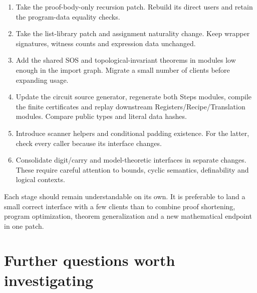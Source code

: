 \documentclass[11pt,letterpaper]{article}
\begin{document}
\begin{enumerate}
\item Take the proof-body-only recursion patch. Rebuild its direct users and retain the program-data equality checks.
\item Take the list-library patch and assignment naturality change. Keep wrapper signatures, witness counts and expression data unchanged.
\item Add the shared SOS and topological-invariant theorems in modules low enough in the import graph. Migrate a small number of clients before expanding usage.
\item Update the circuit source generator, regenerate both Steps modules, compile the finite certificates and replay downstream Registers/Recipe/Translation modules. Compare public types and literal data hashes.
\item Introduce scanner helpers and conditional padding existence. For the latter, check every caller because its interface changes.
\item Consolidate digit/carry and model-theoretic interfaces in separate changes. These require careful attention to bounds, cyclic semantics, definability and logical contexts.
\end{enumerate}

Each stage should remain understandable on its own. It is preferable to land a small correct interface with a few clients than to combine proof shortening, program optimization, theorem generalization and a new mathematical endpoint in one patch.

\section{Further questions worth investigating}
\end{document}
